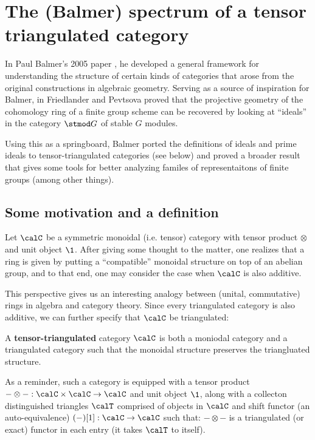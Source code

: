 \documentclass[12pt]{article}
\begin{document}
\newpage
\section{The (Balmer) spectrum of a tensor triangulated category}\label{sec:ttc}
In Paul Balmer's 2005 paper \cite{balmer-spc}, he developed a general framework for understanding the structure of certain 
kinds of categories that arose from the original constructions in algebraic geometry. Serving as a source of inspiration for Balmer, in \cite{friedlander-pevtsova-pi} Friedlander and Pevtsova proved
that the projective geometry of the cohomology ring of a finite group scheme can be recovered by looking at ``ideals'' in the category $\stmod G$ 
of stable $G$ modules.

Using this as a springboard, Balmer ported the definitions of ideals and prime ideals to tensor-triangulated categories (see below)
and proved a broader result that gives some tools for better analyzing familes of representaitons of finite groups (among other things).
\subsection{Some motivation and a definition}
Let $\calC$ be a symmetric monoidal (i.e. tensor) category with tensor product $\otimes$ and unit object $\1$. After giving some 
thought to the matter, one realizes that a ring is given by putting a ``compatible'' monoidal structure on top of an abelian group,
and to that end, one may consider the case when $\calC$ is also additive. 

This perspective gives us an interesting analogy between (unital, commutative) rings in algebra and category theory. Since every 
triangulated category is also additive, we can further specify that $\calC$ be triangulated:
\begin{defn}
	A \textbf{tensor-triangulated} category $\calC$ is both a moniodal category and a triangulated category such that 
	the monoidal structure preserves the triangluated structure. 

	As a reminder, such a category is equipped with a tensor product $-\otimes -:\calC\times\calC\to \calC$ and unit object $\1$, along with
	a collecton distinguished triangles $\calT$ comprised of objects in $\calC$ and shift functor (an auto-equivalence) $(-)[1]:\calC\to \calC$ such that:
	$-\otimes-$ is a triangulated (or exact) functor in each entry (it takes $\calT$ to itself).
\end{defn}
\end{document}
